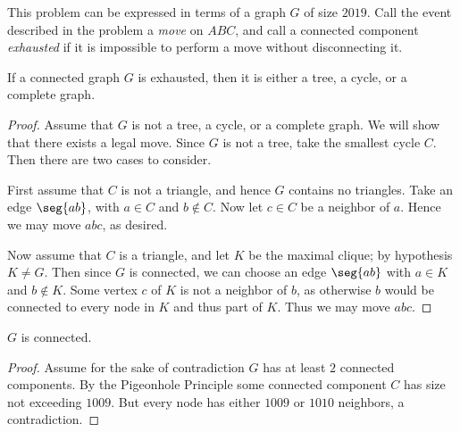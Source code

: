 This problem can be expressed in terms of a graph $G$ of size $2019$. Call the event described in the problem a \textit{move} on $ABC$, and call a connected component \textit{exhausted} if it is impossible to perform a move without disconnecting it.
\begin{lemma*}
    If a connected graph $G$ is exhausted, then it is either a tree, a cycle, or a complete graph.
\end{lemma*}
\begin{proof}
    Assume that $G$ is not a tree, a cycle, or a complete graph. We will show that there exists a legal move. Since $G$ is not a tree, take the smallest cycle $C$. Then there are two cases to consider.

    First assume that $C$ is not a triangle, and hence $G$ contains no triangles. Take an edge $\seg{ab}$, with $a\in C$ and $b\notin C$. Now let $c\in C$ be a neighbor of $a$. Hence we may move $abc$, as desired.

    Now assume that $C$ is a triangle, and let $K$ be the maximal clique; by hypothesis $K\ne G$. Then since $G$ is connected, we can choose an edge $\seg{ab}$ with $a\in K$ and $b\notin K$. Some vertex $c$ of $K$ is not a neighbor of $b$, as otherwise $b$ would be connected to every node in $K$ and thus part of $K$. Thus we may move $abc$.
\end{proof}
%
%
\begin{claim}
    $G$ is connected.
\end{claim}
\begin{proof}
    Assume for the sake of contradiction $G$ has at least $2$ connected components. By the Pigeonhole Principle some connected component $C$ has size not exceeding $1009$. But every node has either $1009$ or $1010$ neighbors, a contradiction.
\end{proof}
